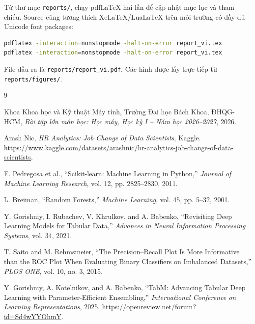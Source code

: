 \documentclass[12pt,a4paper,oneside]{report}
\newcommand{\code}[1]{\texttt{#1}}
\begin{document}
Từ thư mục \code{reports/}, chạy pdfLaTeX hai lần để cập nhật mục lục và tham chiếu. Source cũng tương thích XeLaTeX/LuaLaTeX trên môi trường có đầy đủ Unicode font packages:

\begin{lstlisting}[language=bash]
pdflatex -interaction=nonstopmode -halt-on-error report_vi.tex
pdflatex -interaction=nonstopmode -halt-on-error report_vi.tex
\end{lstlisting}

File đầu ra là \code{reports/report\_vi.pdf}. Các hình được lấy trực tiếp từ \code{reports/figures/}.

\begin{thebibliography}{9}

Khoa Khoa học và Kỹ thuật Máy tính, Trường Đại học Bách Khoa, ĐHQG-HCM,
\textit{Bài tập lớn môn học: Học máy, Học kỳ I -- Năm học 2026--2027}, 2026.

Arash Nic,
\textit{HR Analytics: Job Change of Data Scientists}, Kaggle.
\url{https://www.kaggle.com/datasets/arashnic/hr-analytics-job-change-of-data-scientists}.

F. Pedregosa et al.,
``Scikit-learn: Machine Learning in Python,''
\textit{Journal of Machine Learning Research}, vol. 12, pp. 2825--2830, 2011.

L. Breiman,
``Random Forests,''
\textit{Machine Learning}, vol. 45, pp. 5--32, 2001.

Y. Gorishniy, I. Rubachev, V. Khrulkov, and A. Babenko,
``Revisiting Deep Learning Models for Tabular Data,''
\textit{Advances in Neural Information Processing Systems}, vol. 34, 2021.

T. Saito and M. Rehmsmeier,
``The Precision--Recall Plot Is More Informative than the ROC Plot When Evaluating Binary Classifiers on Imbalanced Datasets,''
\textit{PLOS ONE}, vol. 10, no. 3, 2015.

Y. Gorishniy, A. Kotelnikov, and A. Babenko,
``TabM: Advancing Tabular Deep Learning with Parameter-Efficient Ensembling,''
\textit{International Conference on Learning Representations}, 2025.
\url{https://openreview.net/forum?id=Sd4wYYOhmY}.

\end{thebibliography}
\end{document}
